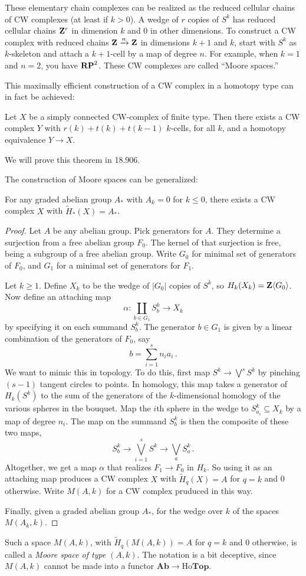 These elementary chain complexes can be realized as the reduced cellular chains of CW complexes (at least if $k>0$). A wedge of $r$ copies of $S^k$ has reduced cellular chains $\mathbf Z^r$ in dimension $k$ and 0 in other dimensions.
To construct a CW complex with reduced chains $\mathbf Z\xrightarrow{n}\mathbf Z$ in dimensions $k+1$ and $k$, start with $S^k$ as $k$-skeleton and attach a $k+1$-cell
by a map of degree $n$.
For example, when $k=1$ and $n=2$, you have $\mathbf{RP}^2$. These CW complexes are
called ``Moore spaces.''

This maximally efficient construction of a CW complex in a homotopy type
can in fact be achieved:

\begin{theorem}[Wall]
Let $X$ be a simply connected CW-complex of finite type. Then there exists a CW complex $Y$ with $r(k)+t(k)+t(k-1)$ $k$-cells, for all $k$, and a homotopy equivalence $Y\to X$.
\end{theorem}

We will prove this theorem in 18.906.

The construction of Moore spaces can be generalized:
\begin{prop} For any graded abelian group $A_*$ with $A_k=0$ for $k\leq0$, 
there exists a CW complex $X$ with $\widetilde H_*(X)=A_*$.
\end{prop}
\begin{proof}
Let $A$ be any abelian group. Pick generators for $A$. 
They determine a surjection
from a free abelian group $F_0$. The kernel of that surjection is free,
being a subgroup of a free abelian group. Write $G_0$ for minimal set of
generators of $F_0$, and $G_1$ for a minimal set of generators for $F_1$.

Let $k\geq1$. Define $X_k$ to be the wedge of $|G_0|$ copies of $S^k$,
so $H_k(X_k)=\mathbf Z\langle G_0\rangle$. Now define an attaching map 
\[
\alpha:\coprod_{b\in G_1} S^k_b\to X_k
\]
by specifying it on each summand $S^k_b$. The generator 
$b\in G_1$ is given by a linear combination of the generators
of $F_0$, say 
\[
b=\sum_{i=1}^s n_ia_i\,.
\]
We want to mimic this in topology. To do this, first
map $S^k\to\bigvee^s S^k$ by pinching $(s-1)$ tangent circles to points. 
In homology, this map takes a generator of $H_k(S^k)$ to the sum of the
generators of the $k$-dimensional homology of the various spheres in the
bouquet.
Map the $i$th sphere in the wedge to $S^k_{a_i}\subseteq X_k$ by a map of
degree $n_i$. The map on the summand $S^k_b$ is then the composite of these 
two maps,
\[
S^k_b\to\bigvee_{i=1}^s S^k\to\bigvee_a S^k_a\,.
\]
Altogether, we get a map $\alpha$ that realizes $F_1\to F_0$ in $H_k$.
So using it as an attaching map produces a CW complex $X$ with 
$\widetilde H_q(X)=A$ for $q=k$ and 0 otherwise. Write $M(A,k)$ for 
a CW complex pruduced in this way.

Finally, given a graded abelian group $A_*$, for the wedge over $k$ of the
spaces $M(A_k,k)$. 
\end{proof}

Such a space $M(A,k)$, with $\widetilde H_q(M(A,k))=A$ for $q=k$ and 0 
otherwise, is called a {\em Moore space of type} $(A,k)$. 
The notation is a bit deceptive, since $M(A,k)$ cannot be made into a functor
$\mathbf{Ab}\to\mathrm{Ho}\mathbf{Top}$.


